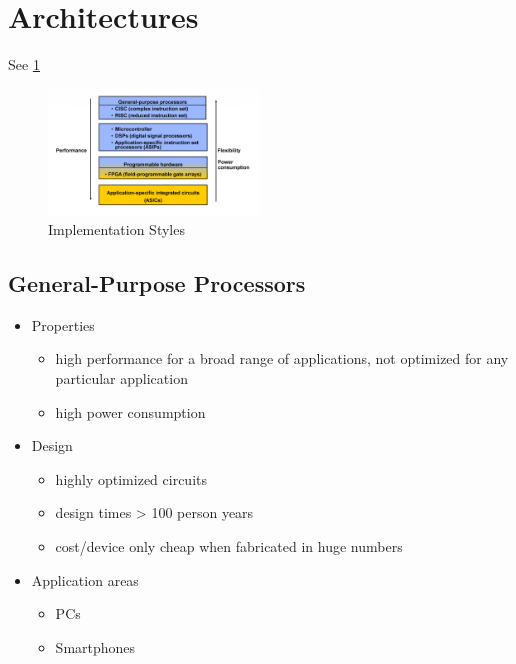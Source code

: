 \section{Architectures}
See \cref{fig:Imp_Sty}

\begin{figure}
	\begin{center}
		\includegraphics[width=0.5\textwidth]{images/Implementaion_styles.png}
		\caption{Implementation Styles}
		\label{fig:Imp_Sty}
	\end{center}
\end{figure}

\subsection{General-Purpose Processors}
\begin{itemize}
	\item Properties
		\begin{itemize}
			\item high performance for a broad range of applications, not optimized for any particular application
			\item high power consumption
		\end{itemize}
	\item Design
		\begin{itemize}
			\item highly optimized circuits
			\item design times > 100 person years
			\item cost/device only cheap when fabricated in huge numbers 
		\end{itemize}
	\item Application areas
		\begin{itemize}
			\item PCs
			\item Smartphones
		\end{itemize}
\end{itemize}

